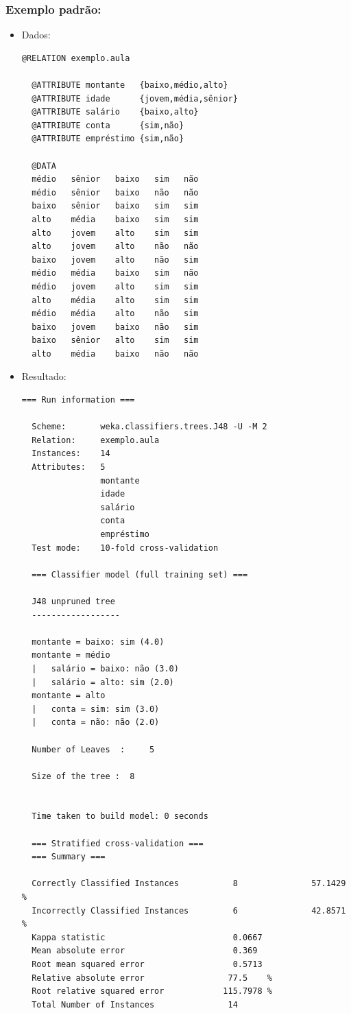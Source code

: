 \documentclass[
    article,            %
    11pt,               %
    oneside,            %
    a4paper,            %
    english,            %
    brazil,             %
    sumario=tradicional,
    ]{abntex2}
\begin{document}
\subsubsection{\textbf{Exemplo padrão:}}
\begin{itemize}
  \item Dados:
  \begin{Verbatim}[frame=single, fontsize=\tiny]
  @RELATION exemplo.aula

  @ATTRIBUTE montante   {baixo,médio,alto}
  @ATTRIBUTE idade      {jovem,média,sênior}
  @ATTRIBUTE salário    {baixo,alto}
  @ATTRIBUTE conta      {sim,não}
  @ATTRIBUTE empréstimo {sim,não}

  @DATA
  médio   sênior   baixo   sim   não 
  médio   sênior   baixo   não   não 
  baixo   sênior   baixo   sim   sim 
  alto    média    baixo   sim   sim 
  alto    jovem    alto    sim   sim 
  alto    jovem    alto    não   não 
  baixo   jovem    alto    não   sim 
  médio   média    baixo   sim   não 
  médio   jovem    alto    sim   sim 
  alto    média    alto    sim   sim 
  médio   média    alto    não   sim 
  baixo   jovem    baixo   não   sim 
  baixo   sênior   alto    sim   sim 
  alto    média    baixo   não   não 
  \end{Verbatim}

  \item Resultado:
  \begin{Verbatim}[frame=single, fontsize=\tiny]
  === Run information ===

  Scheme:       weka.classifiers.trees.J48 -U -M 2
  Relation:     exemplo.aula
  Instances:    14
  Attributes:   5
                montante
                idade
                salário
                conta
                empréstimo
  Test mode:    10-fold cross-validation

  === Classifier model (full training set) ===

  J48 unpruned tree
  ------------------

  montante = baixo: sim (4.0)
  montante = médio
  |   salário = baixo: não (3.0)
  |   salário = alto: sim (2.0)
  montante = alto
  |   conta = sim: sim (3.0)
  |   conta = não: não (2.0)

  Number of Leaves  :     5

  Size of the tree :  8


  Time taken to build model: 0 seconds

  === Stratified cross-validation ===
  === Summary ===

  Correctly Classified Instances           8               57.1429 %
  Incorrectly Classified Instances         6               42.8571 %
  Kappa statistic                          0.0667
  Mean absolute error                      0.369 
  Root mean squared error                  0.5713
  Relative absolute error                 77.5    %
  Root relative squared error            115.7978 %
  Total Number of Instances               14     


\end{Verbatim}
\end{itemize}
\end{document}
